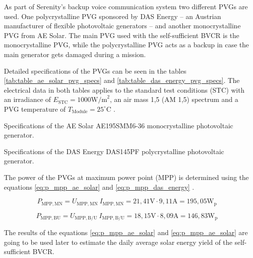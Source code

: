 As part of Serenity's backup voice communication system two different PVGs are used. One polycrystalline PVG sponsored by DAS Energy -- an Austrian manufacturer of flexible photovoltaic generators -- and another monocrystalline PVG from AE Solar. The main PVG used with the self-sufficient BVCR is the monocrystalline PVG, while the polycrystalline PVG acts as a backup in case the main generator gets damaged during a mission.

Detailed specifications of the PVGs can be seen in the tables \ref{tab:table_ae_solar_pvg_specs} and \ref{tab:table_das_energy_pvg_specs}. The electrical data in both tables applies to the standard test conditions (STC) with an irradiance of $E_{\mathrm{STC}} = 1000\mathrm{W/m}^2$, an air mass 1,5 (AM 1,5) spectrum and a PVG temperature of $T_{\mathrm{Module}} = 25^\circ \mathrm{C}$ \cite{Mertens:2015}.

\begin{table}[h!]
	\centering
	
	\caption{Specifications of the AE Solar AE195SMM6-36 monocrystalline photovoltaic generator.}
	\label{tab:table_ae_solar_pvg_specs}
\end{table}

\begin{table}[h!]
	\centering
	
	\caption{Specifications of the DAS Energy DAS145PF polycrystalline photovoltaic generator.}
	\label{tab:table_das_energy_pvg_specs}
\end{table}

The power of the PVGs at maximum power point (MPP) is determined using the equations \ref{eq:p_mpp_ae_solar} and \ref{eq:p_mpp_das_energy} \cite{Prechtl:2006}.

\begin{center}
	\begin{equation} \label{eq:p_mpp_ae_solar}
		P_{\mathrm{MPP,MN}} = U_{\mathrm{MPP,MN}} \ I_{\mathrm{MPP,MN}} = 21,41 \mathrm{V} \cdot 9,11 \mathrm{A} = 195,05 \mathrm{W_p}
	\end{equation}
\end{center}

\begin{center}
	\begin{equation} \label{eq:p_mpp_das_energy}
		P_{\mathrm{MPP,BU}} = U_{\mathrm{MPP,B/U}} \ I_{\mathrm{MPP,B/U}} = 18,15 \mathrm{V} \cdot 8,09 \mathrm{A} = 146,83 \mathrm{W_p}
	\end{equation}
\end{center}

The results of the equations \ref{eq:p_mpp_ae_solar} and \ref{eq:p_mpp_ae_solar} are going to be used later to estimate the daily average solar energy yield of the self-sufficient BVCR.